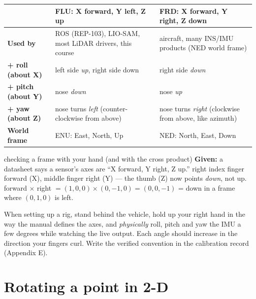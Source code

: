 
\begin{center}\small
\renewcommand{\arraystretch}{1.25}
\begin{tabularx}{\linewidth}{>{\bfseries}p{2.2cm}XX}\toprule
 & FLU: X forward, Y left, Z up & FRD: X forward, Y right, Z down\\\midrule
Used by & ROS (REP-103), LIO-SAM, most LiDAR drivers, this course & aircraft, many INS/IMU products (NED world frame)\\
+ roll (about X) & left side \emph{up}, right side down & right side \emph{down}\\
+ pitch (about Y) & nose \emph{down} & nose \emph{up}\\
+ yaw (about Z) & nose turns \emph{left} (counter-clockwise from above) & nose turns \emph{right} (clockwise from above, like azimuth)\\
World frame & ENU: East, North, Up & NED: North, East, Down\\\bottomrule
\end{tabularx}\end{center}

\begin{worked}{checking a frame with your hand (and with the cross product)}
\textbf{Given:} a datasheet says a sensor's axes are ``X forward, Y right, Z up.''
 right index finger forward (X), middle finger right (Y) --- the thumb (Z) now points \emph{down}, not up.
 forward $\times$ right $=(1,0,0)\times(0,-1,0)=(0,0,-1)$ = down in a frame where $(0,1,0)$ is left.
\end{worked}

\begin{tip}
When setting up a rig, stand behind the vehicle, hold up your right hand in the way the manual defines the axes, and \emph{physically} roll, pitch and yaw the IMU a few degrees while watching the live output. Each angle should increase in the direction your fingers curl. Write the verified convention in the calibration record (Appendix E).
\end{tip}

\section{Rotating a point in 2-D}

